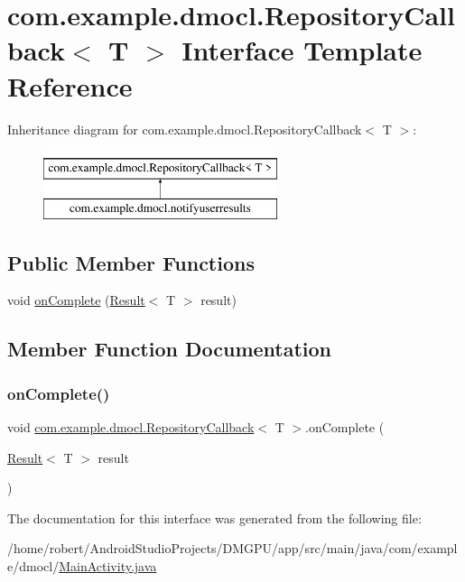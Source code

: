 \hypertarget{interfacecom_1_1example_1_1dmocl_1_1RepositoryCallback}{}\section{com.\+example.\+dmocl.\+Repository\+Callback$<$ T $>$ Interface Template Reference}
\label{interfacecom_1_1example_1_1dmocl_1_1RepositoryCallback}
Inheritance diagram for com.\+example.\+dmocl.\+Repository\+Callback$<$ T $>$\+:\begin{figure}[H]
\begin{center}
\leavevmode
\includegraphics[height=2.000000cm]{interfacecom_1_1example_1_1dmocl_1_1RepositoryCallback}
\end{center}
\end{figure}
\subsection*{Public Member Functions}
\begin{DoxyCompactItemize}
\item 
void \mbox{\hyperlink{interfacecom_1_1example_1_1dmocl_1_1RepositoryCallback_ab1adc69141713cb67641c25e11fec0eb}{on\+Complete}} (\mbox{\hyperlink{classcom_1_1example_1_1dmocl_1_1Result}{Result}}$<$ T $>$ result)
\end{DoxyCompactItemize}


\subsection{Member Function Documentation}
\mbox{\label{interfacecom_1_1example_1_1dmocl_1_1RepositoryCallback_ab1adc69141713cb67641c25e11fec0eb}} 
\subsubsection{\texorpdfstring{on\+Complete()}{onComplete()}}
{\footnotesize\ttfamily void \mbox{\hyperlink{interfacecom_1_1example_1_1dmocl_1_1RepositoryCallback}{com.\+example.\+dmocl.\+Repository\+Callback}}$<$ T $>$.on\+Complete (\begin{DoxyParamCaption}\item[{\mbox{\hyperlink{classcom_1_1example_1_1dmocl_1_1Result}{Result}}$<$ T $>$}]{result }\end{DoxyParamCaption})}



The documentation for this interface was generated from the following file\+:\begin{DoxyCompactItemize}
\item 
/home/robert/\+Android\+Studio\+Projects/\+D\+M\+G\+P\+U/app/src/main/java/com/example/dmocl/\mbox{\hyperlink{MainActivity_8java}{Main\+Activity.\+java}}\end{DoxyCompactItemize}
